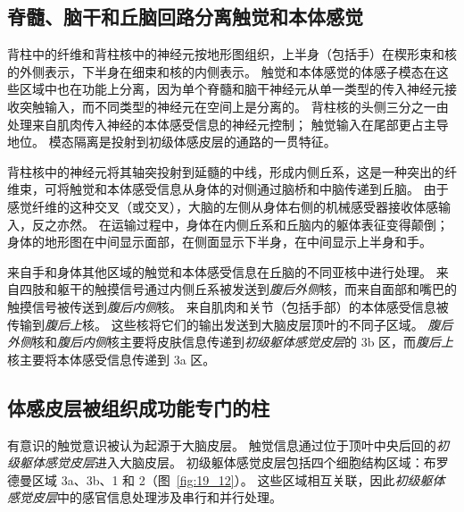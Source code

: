 \subsection{脊髓、脑干和丘脑回路分离触觉和本体感觉}

背柱中的纤维和背柱核中的神经元按地形图组织，上半身（包括手）在楔形束和核的外侧表示，下半身在细束和核的内侧表示。
触觉和本体感觉的体感子模态在这些区域中也在功能上分离，因为单个脊髓和脑干神经元从单一类型的传入神经元接收突触输入，而不同类型的神经元在空间上是分离的。 
背柱核的头侧三分之一由处理来自肌肉传入神经的本体感受信息的神经元控制； 触觉输入在尾部更占主导地位。
模态隔离是投射到初级体感皮层的通路的一贯特征。


背柱核中的神经元将其轴突投射到延髓的中线，形成内侧丘系，这是一种突出的纤维束，可将触觉和本体感受信息从身体的对侧通过脑桥和中脑传递到丘脑。
由于感觉纤维的这种交叉（或交叉），大脑的左侧从身体右侧的机械感受器接收体感输入，反之亦然。
在运输过程中，身体在内侧丘系和丘脑内的躯体表征变得颠倒；
身体的地形图在中间显示面部，在侧面显示下半身，在中间显示上半身和手。


来自手和身体其他区域的触觉和本体感受信息在丘脑的不同亚核中进行处理。
来自四肢和躯干的触摸信号通过内侧丘系被发送到\textit{腹后外侧}核，而来自面部和嘴巴的触摸信号被传送到\textit{腹后内侧}核。
来自肌肉和关节（包括手部）的本体感受信息被传输到\textit{腹后上}核。
这些核将它们的输出发送到大脑皮层顶叶的不同子区域。 
\textit{腹后外侧}核和\textit{腹后内侧}核主要将皮肤信息传递到\textit{初级躯体感觉皮层}的 3b 区，而\textit{腹后上}核主要将本体感受信息传递到 3a 区。



\subsection{体感皮层被组织成功能专门的柱}

有意识的触觉意识被认为起源于大脑皮层。
触觉信息通过位于顶叶中央后回的\textit{初级躯体感觉皮层}进入大脑皮层。
初级躯体感觉皮层包括四个细胞结构区域：布罗德曼区域 3a、3b、1 和 2（图~\ref{fig:19_12}）。
这些区域相互关联，因此\textit{初级躯体感觉皮层}中的感官信息处理涉及串行和并行处理。


